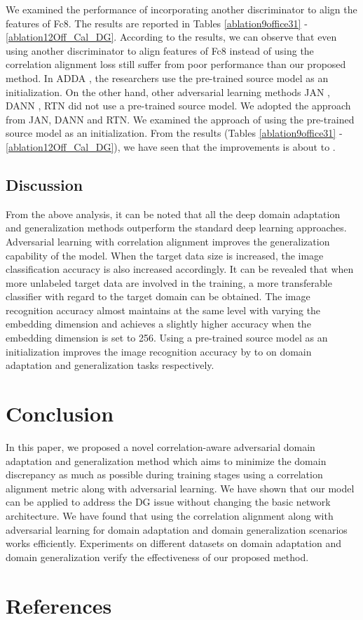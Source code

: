 \documentclass[review]{elsarticle}
\begin{document}
We examined the performance of incorporating another discriminator to align the features of Fc8. The results are reported in Tables \ref{ablation9office31} - \ref{ablation12Off_Cal_DG}. According to the results, we can observe that even using another discriminator to align  features of Fc8  instead of using the correlation alignment loss still suffer from poor performance than our proposed method. In ADDA \cite{8099799}, the researchers use the pre-trained source model as an initialization. On the other hand, other adversarial learning methods JAN \cite{DBLP:conf/icml/LongZ0J17}, DANN \cite{pmlr-v37-ganin15}, RTN \cite{DBLP:conf/nips/LongZ0J16} did not use a pre-trained source model. We adopted the approach from JAN, DANN and RTN. We examined the approach of using the pre-trained source model as an initialization. From the results (Tables \ref{ablation9office31} - \ref{ablation12Off_Cal_DG}), we have seen that the improvements is about  to .

\subsection{Discussion}

From the above analysis, it can be noted that all the deep domain adaptation and generalization methods outperform the standard deep learning approaches. Adversarial learning with correlation alignment improves the generalization capability of the model. When the target data size is increased, the image classification accuracy is also increased accordingly. It can be revealed that when more unlabeled target data are involved in the training, a more transferable classifier with regard to the target domain can be obtained. The image recognition accuracy almost maintains at the same level with varying the embedding dimension and achieves a slightly higher accuracy when the embedding dimension is set to 256. Using a pre-trained source model as an initialization improves the image recognition accuracy by   to  on domain adaptation and generalization tasks respectively.






\section{Conclusion}

In this paper, we proposed a novel correlation-aware adversarial domain adaptation and generalization method which aims to minimize the domain discrepancy as much as possible during training stages using a correlation alignment metric along with adversarial learning. We have shown that our model can be applied to address the DG issue without changing the basic network architecture. We have found that using the correlation alignment along with adversarial learning for domain adaptation and domain generalization scenarios works efficiently. Experiments on different datasets on domain adaptation and domain generalization verify the effectiveness of our proposed method. 



\section*{References}


\end{document}
